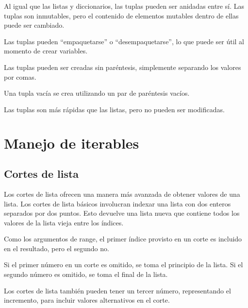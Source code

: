 \documentclass{report}
\newcommand{\doble}[1]{``#1''}
\begin{document}

Al igual que las listas y diccionarios, las tuplas pueden ser anidadas entre sí.
Las tuplas son inmutables, pero el contenido de elementos mutables dentro de ellas puede ser cambiado.


Las tuplas pueden \doble{empaquetarse} o \doble{desempaquetarse}, lo que puede ser útil al momento de crear variables.


Las tuplas pueden ser creadas sin paréntesis, simplemente separando los valores por comas.


Una tupla vacía se crea utilizando un par de paréntesis vacíos.


Las tuplas son más rápidas que las listas, pero no pueden ser modificadas.


\clearpage\chapter{Manejo de iterables}

\section{Cortes de lista}

Los cortes de lista ofrecen una manera más avanzada de obtener valores de una lista. Los cortes de lista básicos involucran indexar una lista con dos enteros separados por dos puntos. Esto devuelve una lista nueva que contiene todos los valores de la lista vieja entre los índices.


Como los argumentos de range, el primer índice provisto en un corte es incluido en el resultado, pero el segundo no.

Si el primer número en un corte es omitido, se toma el principio de la lista. Si el segundo número es omitido, se toma el final de la lista.


Los cortes de lista también pueden tener un tercer número, representando el incremento, para incluir valores alternativos en el corte.
\end{document}
